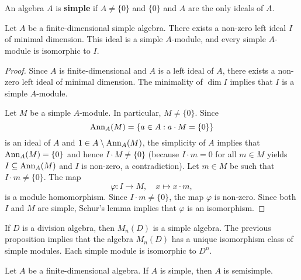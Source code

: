 \section{}
\label{03}

\begin{definition}
    An algebra $A$ is \textbf{simple} if $A\ne\{0\}$ and $\{0\}$ and $A$ are the only ideals of $A$. 
\end{definition}

\begin{proposition}
	Let $A$ be a finite-dimensional simple algebra. There exists a non-zero left ideal 
	$I$ of minimal dimension. This ideal is a simple 
	$A$-module, and every simple $A$-module is isomorphic to $I$.
\end{proposition}

\begin{proof}
	Since $A$ is finite-dimensional and $A$ is a left ideal of $A$, there exists a non-zero left ideal of minimal dimension. The minimality 
	of $\dim I$ implies that $I$ is a simple $A$-module. 
	
	Let $M$ be a simple $A$-module. In particular, $M\ne\{0\}$. 
	Since  
	\[
	\operatorname{Ann}_A(M)=\{a\in A:a\cdot M=\{0\}\}
	\]
	is an ideal of $A$ and $1\in A\setminus\operatorname{Ann}_A(M)$, the simplicity of $A$ implies that 
	$\operatorname{Ann}_A(M)=\{0\}$ and hence $I\cdot M\ne\{0\}$ (because $I\cdot m= 0$ for all $m\in M$ yields  
	$I\subseteq\operatorname{Ann}_A(M)$ and $I$ is non-zero, a contradiction). Let $m\in M$ be such 
	that $I\cdot m\ne\{0\}$. The map 
	\[
	\varphi\colon I\to M,\quad
	x\mapsto x\cdot m,
	\]
	is a module homomorphism. Since $I\cdot m\ne\{0\}$, the map $\varphi$ is non-zero. 
	Since both $I$ and $M$ are simple, Schur's lemma implies that $\varphi$ is an isomorphism. 
\end{proof}

If $D$ is a division algebra, then $M_n(D)$ is a simple algebra. The previous proposition
implies that the algebra $M_n(D)$ has a unique isomorphism class of simple modules. Each simple module
is isomorphic to $D^n$. 

\begin{proposition}
    Let $A$ be a finite-dimensional algebra. 
    If $A$ is simple, then $A$ is semisimple. 
\end{proposition}


